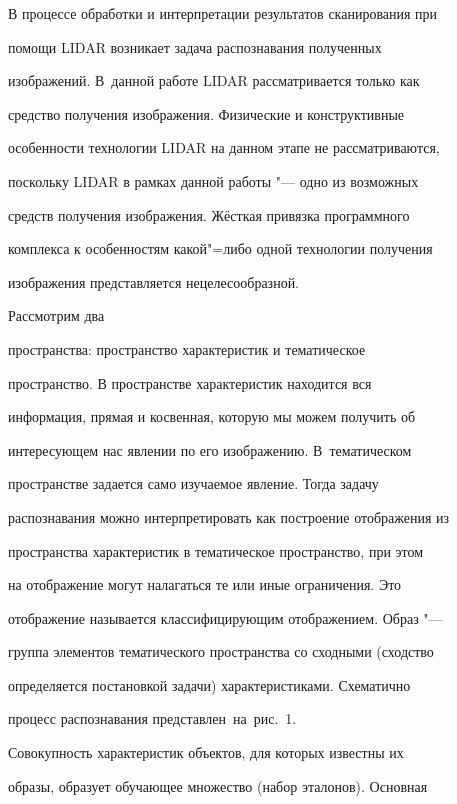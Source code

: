 В процессе обработки и интерпретации результатов сканирования при

помощи LIDAR возникает задача распознавания полученных

изображений. В~данной работе LIDAR рассматривается только как

средство получения изображения. Физические и конструктивные

особенности технологии LIDAR на данном этапе не рассматриваются,

поскольку LIDAR в рамках данной работы "--- одно из возможных

средств получения изображения. Жёсткая привязка программного

комплекса к особенностям какой"=либо одной технологии получения

изображения представляется нецелесообразной.



\smallskip



 Рассмотрим два

пространства: пространство характеристик и тематическое

пространство. В пространстве характеристик находится вся

информация, прямая и косвенная, которую мы можем получить об

интересующем нас явлении по его изображению. В~тематическом

пространстве задается само изучаемое явление. Тогда задачу

распознавания можно интерпретировать как построение отображения из

пространства характеристик в тематическое пространство, при этом

на отображение могут налагаться те или иные ограничения. Это

отображение называется классифицирующим отображением. Образ "---

группа элементов тематического пространства со сходными (сходство

определяется постановкой задачи) характеристиками. Схематично

процесс распознавания представлен~на~рис.~1.



Совокупность характеристик объектов, для которых известны их

образы, образует обучающее множество (набор эталонов). Основная

